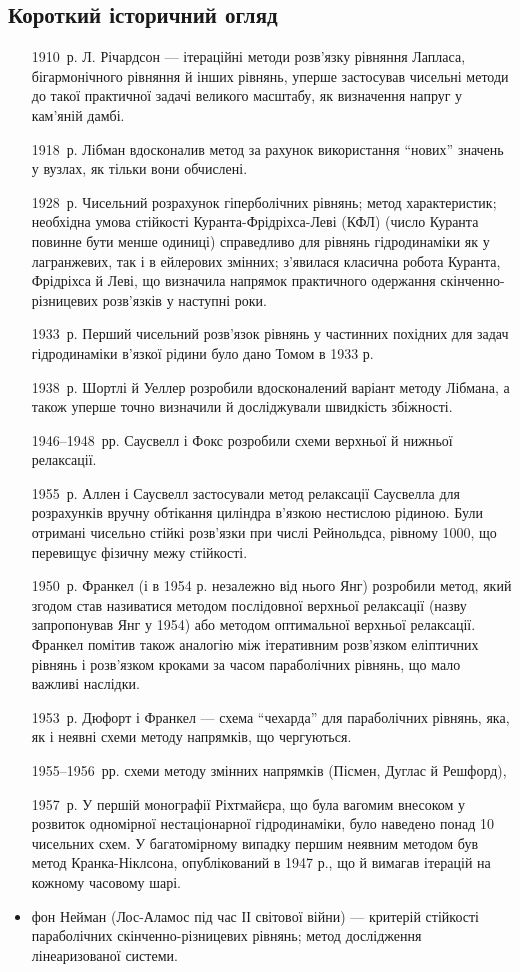 \subsection{Короткий історичний огляд}

\begin{itemize}
    \item[1910~р.] Л. Річардсон --- ітераційні методи розв'язку рівняння Лапласа, бігармонічного рівняння й інших рівнянь, уперше застосував чисельні методи до такої практичної задачі великого масштабу, як визначення напруг у кам'яній дамбі. 
    \item[1918~р.] Лібман вдосконалив метод за рахунок використання ``нових'' значень у вузлах, як тільки вони обчислені. 
    \item[1928~р.] Чисельний розрахунок гіперболічних рівнянь; метод характеристик; необхідна умова стійкості Куранта-Фрідріхса-Леві (КФЛ) (число Куранта повинне бути менше одиниці) справедливо для рівнянь гідродинаміки як у лагранжевих, так і в ейлерових змінних; з'явилася класична робота Куранта, Фрідріхса й Леві, що визначила напрямок практичного одержання скінченно-різницевих розв'язків у наступні роки.
    \item[1933~р.] Перший чисельний розв'язок рівнянь у частинних похідних для задач гідродинаміки в'язкої рідини було дано Томом в 1933 р.
    \item[1938~р.] Шортлі й Уеллер розробили вдосконалений варіант методу Лібмана, а також уперше точно визначили й досліджували швидкість збіжності.
    \item[1946--1948~рр.] Саусвелл і Фокс розробили схеми верхньої й нижньої релаксації.
    \item[1955~р.] Аллен і Саусвелл застосували метод релаксації Саусвелла для розрахунків вручну обтікання циліндра в'язкою нестислою рідиною. Були отримані чисельно стійкі розв'язки при числі Рейнольдса, рівному 1000, що перевищує фізичну межу стійкості. 
    \item[1950~р.] Франкел (і в 1954 р. незалежно від нього Янг) розробили метод, який згодом став називатися методом послідовної верхньої релаксації (назву запропонував Янг у 1954) або методом оптимальної верхньої релаксації. Франкел помітив також аналогію між ітеративним розв'язком еліптичних рівнянь і розв'язком кроками за часом параболічних рівнянь, що мало важливі наслідки.
    \item[1953~р.] Дюфорт і Франкел --- схема ``чехарда'' для параболічних рівнянь, яка, як і неявні схеми методу напрямків, що чергуються.
    \item[1955--1956~рр.] схеми методу змінних напрямків (Пісмен, Дуглас й Решфорд),
    \item[1957~р.] У першій монографії Ріхтмайєра, що була вагомим внесоком у розвиток одномірної нестаціонарної гідродинаміки, було наведено понад 10 чисельних схем. У багатомірному випадку першим неявним методом був метод Кранка-Ніклсона, опублікований в 1947 р., що й вимагав ітерацій на кожному часовому шарі. 
    \item фон Нейман (Лос-Аламос під час ІІ світової війни) --- критерій стійкості параболічних скінченно-різницевих рівнянь; метод дослідження лінеаризованої системи. 
\end{itemize}

